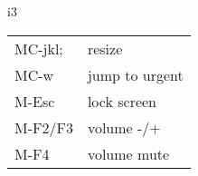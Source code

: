 \begin{conceptbox}[white]{i3}
\begin{tabular}{ll}
MC-jkl;&resize\\
MC-w&jump to urgent\\
M-Esc&lock screen\\
M-F2/F3&volume -/+\\
M-F4&volume mute\\
\end{tabular}
\end{conceptbox}
